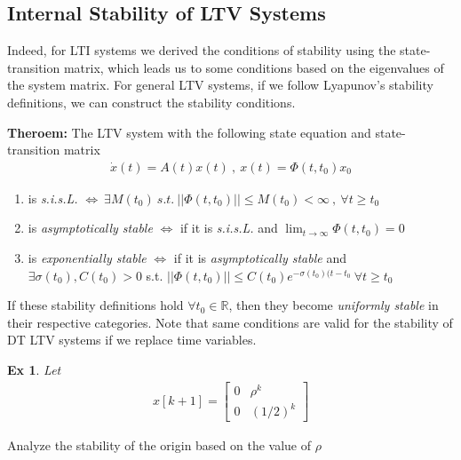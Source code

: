 \documentclass[twoside]{article}
\newtheorem{exmp}[theorem]{Ex}
\begin{document}
\subsection{Internal Stability of LTV Systems}

Indeed, for LTI systems we derived the conditions of stability using the state-transition matrix, 
which leads us to some conditions based on the eigenvalues of the system matrix. For general LTV systems,
if we follow Lyapunov's stability definitions, we can construct the stability conditions.

\textbf{Theroem:} The LTV system with the following state equation and state-transition matrix
%
\begin{align*}
 \dot{x}(t) = A(t) x(t) \ , \ x(t) = \Phi(t,t_0) x_0
\end{align*}
%
\begin{enumerate}
\item is \textit{s.i.s.L.} $\iff \ \exists M(t_0) \ s.t. \ || \Phi(t,t_0) || \leq M(t_0) < \infty \ , \ \forall t \geq t_0$
\item is \textit{asymptotically stable} $\iff$ if it is \textit{s.i.s.L.} and $ \lim_{t \to \infty} \Phi(t,t_0) = 0$
\item is \textit{exponentially stable} $\iff$ if it is \textit{asymptotically stable} and 
$ \exists \sigma(t_0) , C(t_0) > 0 $ s.t. $ || \Phi(t,t_0) || \leq C(t_0) e^{-\sigma(t_0) (t - t_0} \ \forall t \geq t_0$
\end{enumerate}
% 
If these stability definitions hold $\forall t_0 \in \mathbb{R}$, then they become \textit{uniformly stable} in their respective 
categories. Note that same conditions are valid for the stability of DT LTV systems if we replace time variables. 

\begin{exmp}
 Let 
 \begin{align*}
  x[k+1] = \begin{bmatrix} 0 & \rho^k  \\ 0 & (1/2)^k \end{bmatrix}
 \end{align*}
\end{exmp}
Analyze the stability of the origin based on the value of $\rho$
\end{document}
